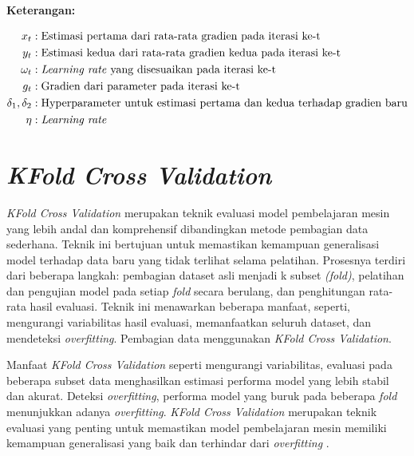  \textbf{Keterangan:}

    \begin{align*}
    x_t &: \text{Estimasi pertama dari rata-rata gradien pada iterasi ke-t}\\
    y_t &: \text{Estimasi kedua dari rata-rata gradien kedua pada iterasi ke-t}\\
    \omega_t &: \text{\textit{Learning rate} yang disesuaikan pada iterasi ke-t}\\
    g_t &: \text{Gradien dari parameter pada iterasi ke-t}\\
    \delta_1, \delta_2 &: \text{Hyperparameter untuk estimasi pertama dan kedua terhadap gradien baru}\\
    \eta &: \text{\textit{Learning rate}}\\
\end{align*}


\section{\textit{KFold Cross Validation}}

\textit{KFold Cross Validation} merupakan teknik evaluasi model pembelajaran mesin yang lebih andal dan komprehensif dibandingkan 
metode pembagian data sederhana. Teknik ini bertujuan untuk memastikan kemampuan generalisasi model terhadap data baru yang 
tidak terlihat selama pelatihan. Prosesnya terdiri dari beberapa langkah: pembagian dataset asli menjadi k subset \textit{(fold)},
 pelatihan dan pengujian model 
pada setiap \textit{fold} secara berulang, dan penghitungan rata-rata hasil evaluasi. Teknik ini menawarkan beberapa manfaat, 
seperti, mengurangi variabilitas hasil evaluasi, memanfaatkan seluruh dataset, dan mendeteksi \textit{overfitting}. Pembagian 
data menggunakan \textit{KFold Cross Validation}.

Manfaat \textit{KFold Cross Validation} seperti mengurangi variabilitas, evaluasi pada beberapa subset data menghasilkan 
estimasi performa model yang lebih stabil dan akurat. Deteksi \textit{overfitting}, performa model yang buruk pada beberapa 
\textit{fold} menunjukkan adanya \textit{overfitting}.
\textit{KFold Cross Validation} merupakan teknik evaluasi yang penting untuk memastikan model pembelajaran mesin memiliki
kemampuan generalisasi yang baik dan terhindar dari \textit{overfitting} \cite{hastie2009elements}.








